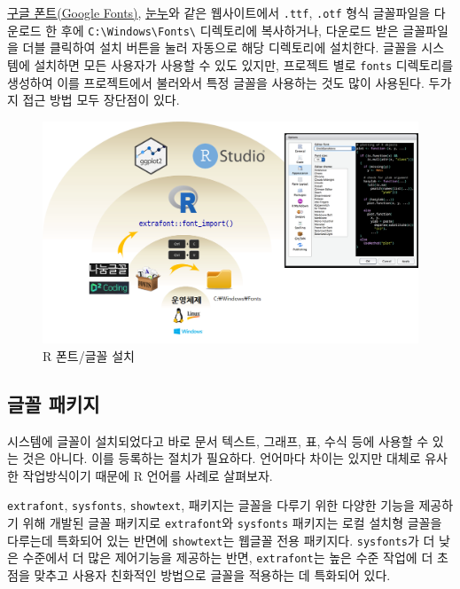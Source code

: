 \documentclass[
  letterpaper,
]{book}
\begin{document}
\href{https://fonts.google.com/}{구글 폰트(Google Fonts)},
\href{https://noonnu.cc/}{눈누}와 같은 웹사이트에서 \texttt{.ttf},
\texttt{.otf} 형식 글꼴파일을 다운로드 한 후에
\texttt{C:\textbackslash{}Windows\textbackslash{}Fonts\textbackslash{}}
디렉토리에 복사하거나, 다운로드 받은 글꼴파일을 더블 클릭하여 설치
버튼을 눌러 자동으로 해당 디렉토리에 설치한다. 글꼴을 시스템에 설치하면
모든 사용자가 사용할 수 있도 있지만, 프로젝트 별로 \texttt{fonts}
디렉토리를 생성하여 이를 프로젝트에서 불러와서 특정 글꼴을 사용하는 것도
많이 사용된다. 두가지 접근 방법 모두 장단점이 있다.

\begin{figure}

{\centering \includegraphics[width=1\textwidth,height=\textheight]{images/font_overview.png}

}

\caption{R 폰트/글꼴 설치}

\end{figure}

\hypertarget{uxae00uxaf34-uxd328uxd0a4uxc9c0}{%
\subsection{글꼴 패키지}\label{uxae00uxaf34-uxd328uxd0a4uxc9c0}}

시스템에 글꼴이 설치되었다고 바로 문서 텍스트, 그래프, 표, 수식 등에
사용할 수 있는 것은 아니다. 이를 등록하는 절치가 필요하다. 언어마다
차이는 있지만 대체로 유사한 작업방식이기 때문에 R 언어를 사례로
살펴보자.

\texttt{extrafont}, \texttt{sysfonts}, \texttt{showtext}, 패키지는
글꼴을 다루기 위한 다양한 기능을 제공하기 위해 개발된 글꼴 패키지로
\texttt{extrafont}와 \texttt{sysfonts} 패키지는 로컬 설치형 글꼴을
다루는데 특화되어 있는 반면에 \texttt{showtext}는 웹글꼴 전용 패키지다.
\texttt{sysfonts}가 더 낮은 수준에서 더 많은 제어기능을 제공하는 반면,
\texttt{extrafont}는 높은 수준 작업에 더 초점을 맞추고 사용자 친화적인
방법으로 글꼴을 적용하는 데 특화되어 있다.
\end{document}
